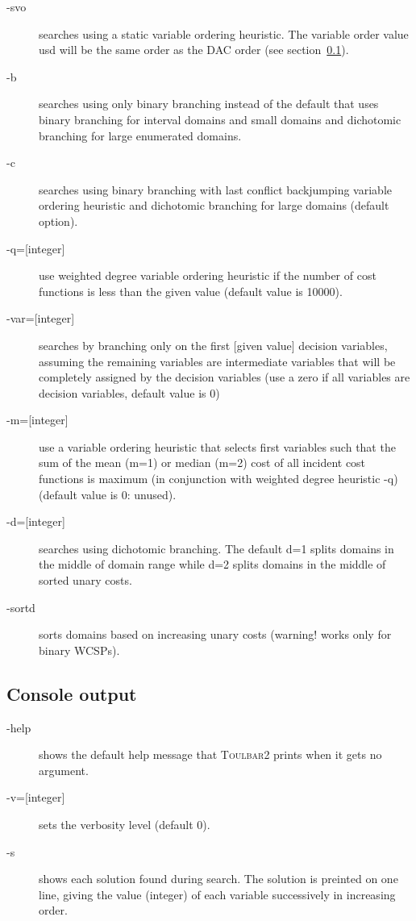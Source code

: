 \documentclass{article}
\def\toulbar2{\textsc{Toulbar2}}
\begin{document}
\begin{description}
\item[-svo] searches using a static variable ordering heuristic. The
  variable order value usd will be the same order as the DAC order
  (see section~\ref{}).
\item[-b] searches using only binary branching instead of the default
  that uses binary branching for interval domains and small domains
  and dichotomic branching for large enumerated domains.
\item[-c] searches using binary branching with last conflict
  backjumping variable ordering heuristic and dichotomic branching for
  large domains (default option).
\item[{-q=[integer]}] use
  weighted degree variable ordering heuristic if the number of cost
  functions is less than the given value (default value is 10000).
\item[{-var=[integer]}]
  searches by branching only on the first [given value]
  decision variables, assuming the remaining variables are
  intermediate variables that will be completely assigned by the
  decision variables (use a zero if all variables are decision
  variables, default value is 0)
\item[{-m=[integer]}]
  use a variable ordering heuristic that selects first variables such
  that the sum of the mean (m=1) or median (m=2) cost of all incident
  cost functions is maximum (in conjunction with weighted degree
  heuristic -q) (default value is 0: unused).
\item[{-d=[integer]}]
  searches using dichotomic branching. The default d=1 splits domains
  in the middle of domain range while d=2 splits domains in the middle
  of sorted unary costs. 
\item[-sortd] sorts domains based on increasing unary costs (warning!
  works only for binary WCSPs).
\end{description}

\subsection{Console output}

\begin{description}
\item[-help] shows the default help message that \toulbar2 prints when
  it gets no argument.
\item[{-v=[integer]}] sets the verbosity level (default 0).
\item[-s] shows each solution found during search. The solution is
  preinted on one line, giving the value (integer) of each variable
  successively in increasing order.
\end{description}
\end{document}
